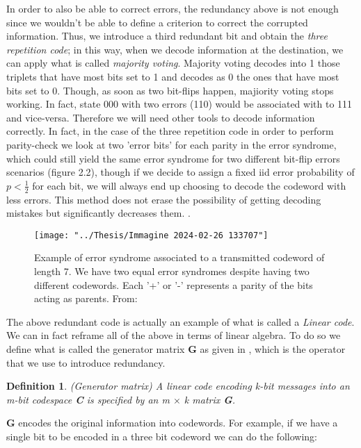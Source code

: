 \documentclass{Configuration_Files/PoliMi3i_thesis}
\newtheorem{definition}{Definition}[chapter]
\begin{document}
In order to also be able to correct errors, the redundancy above is not enough since we wouldn't be able to define a criterion to correct the corrupted information. Thus, we introduce a third redundant bit and obtain the {\it three repetition code}; in this way, when we decode information at the destination, we can apply what is called {\it majority voting}. Majority voting decodes into 1 those triplets that have most bits set to 1 and decodes as 0 the ones that have most bits set to 0. Though, as soon as two bit-flips happen, majiority voting stops working. In fact, state 000 with two errors (110) would be associated with to 111 and vice-versa. Therefore we will need other tools to decode information correctly. In fact, in the case of the three repetition code in order to perform parity-check we look at two 'error bits' for each parity in the error syndrome, which could still yield the same error syndrome for two different bit-flip errors scenarios (figure 2.2), though if we decide to assign a fixed iid error probability of $p<\frac{1}{2}$ for each bit, we will always end up choosing to decode the codeword with less errors. This method does not erase the possibility of getting decoding mistakes but significantly decreases them. \cite{Kas19}.\newline


\begin{figure}
	\centering
	\texttt{[image: "../Thesis/Immagine 2024-02-26 133707"]}
	\caption{{ Example of error syndrome associated to a transmitted codeword of length 7. We have two equal error syndromes despite having two different codewords. Each '+' or '-' represents a parity of the bits acting as parents. From: \cite{Kas19}}}
	\label{fig:immagine-2024-02-26-133707}
\end{figure}

The above redundant code is actually an example of what is called a {\it Linear code}.
We can in fact reframe all of the above in terms of linear algebra. To do so we define what is called the generator matrix  \textbf{G} as given in \cite{Cha06,Kas19}, which is the operator that we use to introduce redundancy. 

\begin{definition}(Generator matrix)
	A linear code encoding k-bit messages into an m-bit codespace \textbf{C} is specified by an m $\times$ k matrix {\bf G}.
\end{definition}

\textbf{G} encodes the original information into { codewords}. For example, if we have a single bit to be encoded in a three bit codeword we can do the following: 
\end{document}
